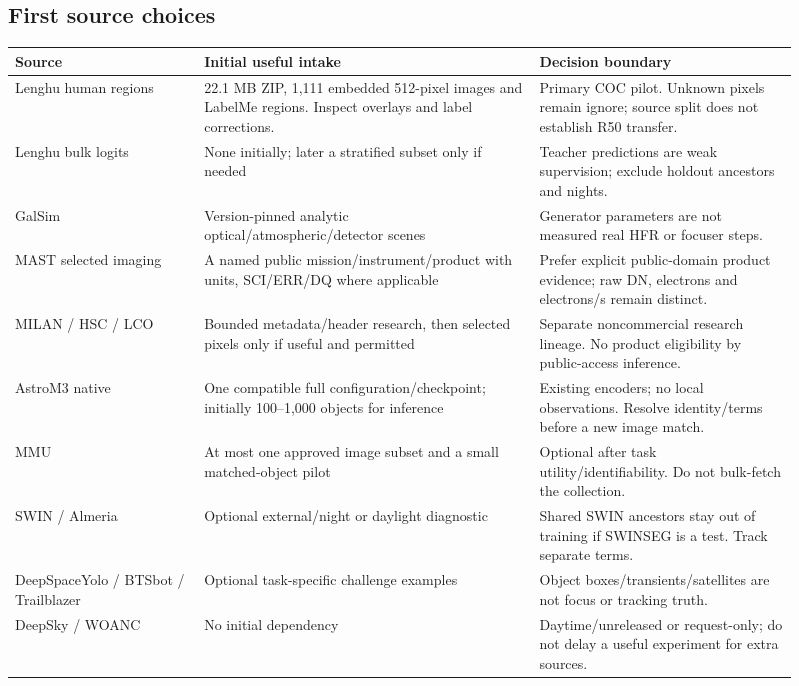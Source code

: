 \documentclass[11pt,a4paper]{article}
\begin{document}
\subsection{First source choices}
\begin{longtable}{@{}L{0.22\linewidth}L{0.39\linewidth}L{0.30\linewidth}@{}}
\toprule Source & Initial useful intake & Decision boundary\\\midrule\endhead
Lenghu human regions & 22.1 MB ZIP, 1,111 embedded 512-pixel images and LabelMe
regions. Inspect overlays and label corrections. & Primary COC pilot. Unknown
pixels remain ignore; source split does not establish R50 transfer.\\
Lenghu bulk logits & None initially; later a stratified subset only if needed &
Teacher predictions are weak supervision; exclude holdout ancestors and nights.\\
GalSim & Version-pinned analytic optical/atmospheric/detector scenes &
Generator parameters are not measured real HFR or focuser steps.\\
MAST selected imaging & A named public mission/instrument/product with units,
SCI/ERR/DQ where applicable & Prefer explicit public-domain product evidence;
raw DN, electrons and electrons/s remain distinct.\\
MILAN / HSC / LCO & Bounded metadata/header research, then selected pixels only
if useful and permitted & Separate noncommercial research lineage. No product
eligibility by public-access inference.\\
AstroM3 native & One compatible full configuration/checkpoint; initially
100--1,000 objects for inference & Existing encoders; no local observations.
Resolve identity/terms before a new image match.\\
MMU & At most one approved image subset and a small matched-object pilot &
Optional after task utility/identifiability. Do not bulk-fetch the collection.\\
SWIN / Almeria & Optional external/night or daylight diagnostic & Shared SWIN
ancestors stay out of training if SWINSEG is a test. Track separate terms.\\
DeepSpaceYolo / BTSbot / Trailblazer & Optional task-specific challenge examples &
Object boxes/transients/satellites are not focus or tracking truth.\\
DeepSky / WOANC & No initial dependency & Daytime/unreleased or request-only;
do not delay a useful experiment for extra sources.\\
\bottomrule
\end{longtable}
\end{document}
